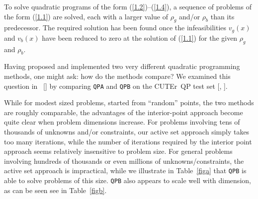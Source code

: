 \documentclass[acmtocl,acmnow]{acmtrans2m}
\newcommand{\req}[1]{(\ref{#1})}
\newcommand{\cuter}{{\sf CUTEr}}
\newcommand{\citebb}[1]{\citeauthor{#1}\ [\citeyear{#1}]}
\newcommand{\bciteb}[1]{\citeauthor{#1}, \citeyear{#1}}
\begin{document}
To solve quadratic programs of the form \req{1.2}--\req{1.4}, 
a sequence of problems of the form \req{1.1} are
solved, each with a larger value of $\rho_g$ and/or $\rho_b$ 
than its predecessor. The
required solution has been found once the infeasibilities 
$v_g(x)$ and $v_b(x)$ have been reduced to zero at the solution of 
\req{1.1} for the given $\rho_g$ and $\rho_b$.

Having proposed and implemented two very different quadratic programming
methods, one might ask: how do the methods compare? We examined
this question in \citebb{GoulToin01c} by comparing {\tt QPA} and {\tt QPB}
on the \cuter\ QP test set [\bciteb{GoulOrbaToin02b}].

While for modest sized problems, started from ``random'' points, the two
methods are roughly comparable, the advantages of the interior-point approach
become quite clear when problem dimensions increase. For problems involving
tens of thousands of unknowns and/or constraints, our active set approach
simply takes too many iterations, while the number of iterations 
required by the interior point approach seems relatively insensitive to 
problem size. For general problems involving hundreds of thousands or
even millions of unknowns/constraints, the active set approach is impractical,
while we illustrate in Table~\ref{figa} that
{\tt QPB} is able to solve problems of this size.
{\tt QPB} also appears to scale well with dimension, as can be seen 
see in Table~\ref{figb}.
\end{document}
